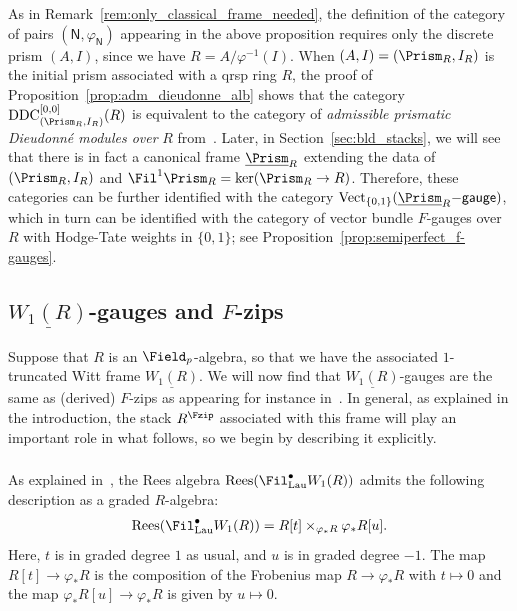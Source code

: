 \documentclass[10pt]{amsart}
\begin{document}
\begin{remark}
\label{rem:comparison_with_alb}
As in Remark~\ref{rem:only_classical_frame_needed}, the definition of the category of pairs $(\mathsf{N},\varphi_{\mathsf{N}})$ appearing in the above proposition requires only the discrete prism $(A,I)$, since we have $R = A/\varphi^{-1}(I)$. When $(A,I) = (\Prism_R,I_R)$ is the initial prism associated with a qrsp ring $R$, the proof of Proposition~\ref{prop:adm_dieudonne_alb} shows that the category $\mathrm{DDC}^{[0,0]}_{(\Prism_R,I_R)}(R)$ is equivalent to the category of \emph{admissible prismatic Dieudonn\'e modules over} $R$ from~\cite[Definition 4.10]{MR4530092}. Later, in Section~\ref{sec:bld_stacks}, we will see that there is in fact a canonical frame $\underline{\Prism}_R$ extending the data of $(\Prism_R,I_R)$ and $\Fil^1\Prism_R = \ker(\Prism_R\to R)$. Therefore, these categories can be further identified with the category $\mathrm{Vect}_{\{0,1\}}(\underline{\Prism}_R\mathsf{-gauge})$, which in turn can be identified with the category of vector bundle $F$-gauges over $R$ with Hodge-Tate weights in $\{0,1\}$; see Proposition~\ref{prop:semiperfect_f-gauges}.
\end{remark}



\subsection{$\underline{W_1(R)}$-gauges and $F$-zips}
\label{subsec:Fzip_stack}

Suppose that $R$ is an $\Field_p$-algebra, so that we have the associated $1$-truncated Witt frame $\underline{W_1(R)}$. We will now find that $\underline{W_1(R)}$-gauges are the same as (derived) $F$-zips as appearing for instance in~\cite{epiga:10375}. In general, as explained in the introduction, the stack $R^{\Fzip}$ associated with this frame will play an important role in what follows, so we begin by describing it explicitly.

\subsubsection{}\label{subsubsec:fzip_stack_construction}
As explained in~\cite[Example 2.1.7]{MR4355476}, the Rees algebra $\mathrm{Rees}(\Fil^\bullet_{\mathrm{Lau}}W_1(R))$ admits the following description as a graded $R$-algebra:
\begin{align}\label{eqn:rees_W1_explicit}
\mathrm{Rees}(\Fil^\bullet_{\mathrm{Lau}}W_1(R)) = R[t]\times_{\varphi_*R}\varphi_*R[u].
\end{align}
Here, $t$ is in graded degree $1$ as usual, and $u$ is in graded degree $-1$. The map $R[t]\to \varphi_*R$ is the composition of the Frobenius map $R\to \varphi_*R$ with $t\mapsto 0$ and the map $\varphi_*R[u]\to \varphi_*R$ is given by $u\mapsto 0$. 
\end{document}
